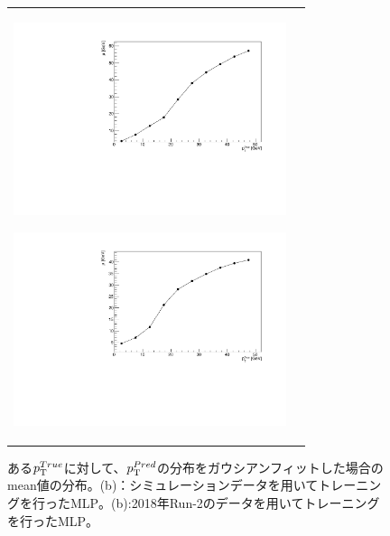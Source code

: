 \begin{figure}
    \begin{tabular}{cc}
    \centering
    \begin{minipage}[b]{0.45\hsize}%
        \centering
        \hspace*{-1cm}
        \includegraphics[clip, width=8cm]{fig/4/tp_Gausmean_MC.pdf}
        \subcaption{}
        \label{}
    \end{minipage}%
    \begin{minipage}[b]{0.7\hsize}%
        \centering
        \includegraphics[clip, width=8cm]{fig/4/tp_Gausmean_Data.pdf}
        \subcaption{}
        \label{MC_input}
    \end{minipage}%
    \end{tabular}
    \caption{ある$p_{\rm{T}}^{True}$に対して、$p_{\rm{T}}^{Pred}$の分布をガウシアンフィットした場合のmean値の分布。(b)：シミュレーションデータを用いてトレーニングを行ったMLP。(b):2018年Run-2のデータを用いてトレーニングを行ったMLP。}
    \label{fig:Gausmu}
\end{figure}


